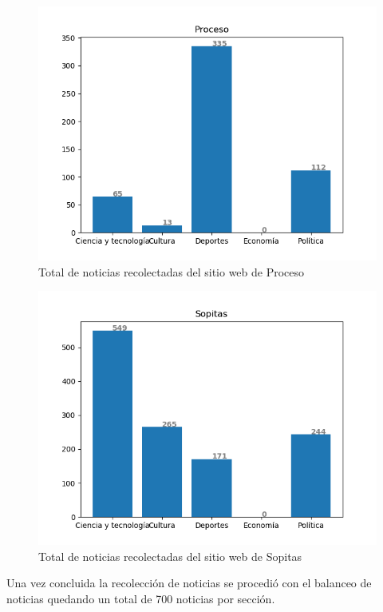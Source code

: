 \begin{figure}[H]
	\centering
	\includegraphics[scale=.45]{imagenes/Capitulo5/proceso.png}
	\caption{Total de noticias recolectadas del sitio web de Proceso}
	\label{Fig:notsitioproceso}
\end{figure}

\begin{figure}[H]
	\centering
	\includegraphics[scale=.45]{imagenes/Capitulo5/sopitas.png}
	\caption{Total de noticias recolectadas del sitio web de Sopitas}
	\label{Fig:notsitiosopitas}
\end{figure}

Una vez concluida la recolección de noticias se procedió con el balanceo de noticias quedando un total de 700 noticias por sección.	